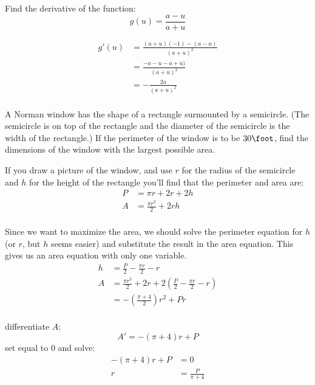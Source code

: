 \documentclass[fleqn,addpoints]{exam}
\begin{document}
\begin{questions}
\begin{solution}
\end{solution}

\ifprintanswers
\pagebreak
\fi

\question
Find the derivative of the function:
\[
  g(u) = \frac{a - u}{a + u}
\]

\begin{solution}
\begin{align*}
  g'(u) &= \frac{(a + u)(-1) - (a - u)}{(a + u)^2} \\
        &= \frac{-a - u - a + u)}{(a + u)^2} \\
        &= - \frac{2a}{(a + u)^2} \\
\end{align*}

\end{solution}

\question A Norman window has the shape of a rectangle surmounted by a semicircle. (The semicircle is on top of the
rectangle and the diameter of the semicircle is the width of the rectangle.) If the perimeter of the window is to be $30
\foot$, find the dimensions of the window with the largest possible area.

\begin{solution}
If you draw a picture of the window, and use $r$ for the radius of the semicircle and $h$ for the height of the
rectangle you'll find that the perimeter and area are: 
\begin{align*}
  P &= \pi r + 2r + 2h \\
  A &= \frac{\pi r^2}{2} + 2rh \\
\end{align*}

Since we want to maximize the area, we should solve the perimeter equation for $h$ (or $r$, but $h$ seems easier) and
substitute the result in the area equation.  This gives us an area equation with only one variable.
\begin{align*}
  h &= \frac{P}{2} - \frac{\pi r}{2} - r \\
  A &= \frac{\pi r^2}{2} + 2r + 2 \left( \frac{P}{2} - \frac{\pi r}{2} - r \right) \\
    &= - \left( \frac{\pi + 4}{2} \right) r^2 + Pr \\
\end{align*}

differentiate $A$:
\[
  A' = - (\pi + 4)r + P
\]
set equal to 0 and solve:
\begin{align*}
  - (\pi + 4)r + P &= 0 \\
  r &= \frac{P}{\pi + 4} \\
\end{align*}


\end{solution}
\end{questions}
\end{document}
